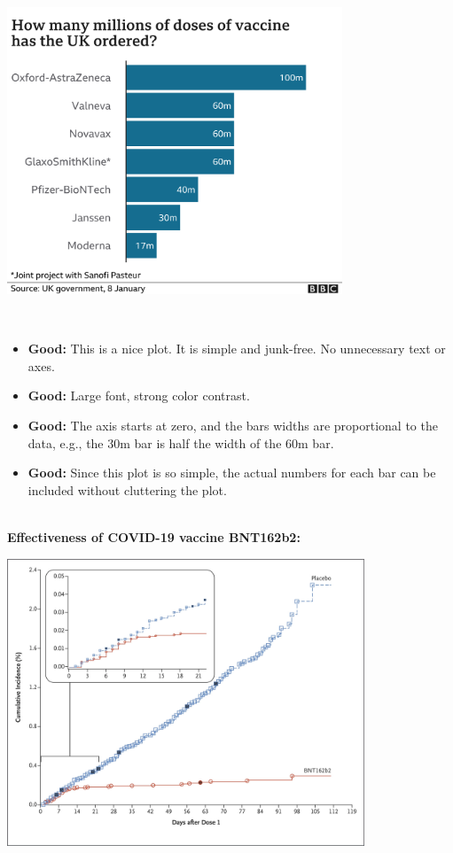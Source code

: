 \documentclass[
]{book}
\providecommand{\tightlist}{%
  \setlength{\itemsep}{0pt}\setlength{\parskip}{0pt}}
\begin{document}
~\\

\includegraphics[width=0.75\textwidth,height=\textheight]{img/visc.png}

~

\begin{itemize}
\tightlist
\item
  \textbf{Good:} This is a nice plot. It is simple and junk-free. No unnecessary text or axes.
\item
  \textbf{Good:} Large font, strong color contrast.\\
\item
  \textbf{Good:} The axis starts at zero, and the bars widths are proportional to the data, e.g., the 30m bar is half the width of the 60m bar.\\
\item
  \textbf{Good:} Since this plot is so simple, the actual numbers for each bar can be included without cluttering the plot.
\end{itemize}

~\\
\textbf{Effectiveness of COVID-19 vaccine BNT162b2:}

\includegraphics[width=0.8\textwidth,height=\textheight]{img/visd.png}
\end{document}
